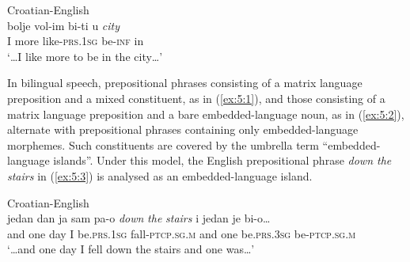 \ea
\label{ex:5:2}
Croatian-English \citep[202]{hlavac-second-generation-2003}\\
 {bolje} {vol-im} {bi-ti} {u} \textit{city} \\
	{I} more like-\textsc{prs.1sg} be-\textsc{inf} in {}\\
\glt `\dots{}I like more to be in the city\dots{}'
\z

\noindent In bilingual speech, prepositional phrases consisting of a matrix language preposition and a mixed constituent, as in (\ref{ex:5:1}), and those consisting of a matrix language preposition and a bare embedded-language noun, as in (\ref{ex:5:2}), alternate with prepositional phrases containing only embedded-language morphemes. Such constituents are covered by the umbrella term “embedded-language islands”. Under this model, the English prepositional phrase \textit{down the stairs} in (\ref{ex:5:3}) is analysed as an embedded-language island.

\ea
\label{ex:5:3}
Croatian-English \citep[227]{hlavac-second-generation-2003}\\
 {jedan} {dan} {ja} {sam} {pa-o} \textit{down} \textit{the} \textit{stairs} {i} {jedan} {je} {bi-o\dots{}}\\
	{and} one day I be.\textsc{prs.1sg} fall-\textsc{ptcp.sg.m} {} {} {} and one be.\textsc{prs.3sg} be-\textsc{ptcp.sg.m}\\
\glt `\dots{}and one day I fell down the stairs and one was\dots{}'

\z


